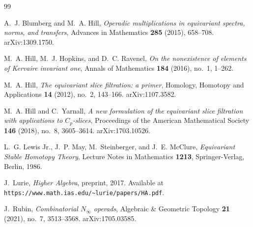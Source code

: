 \documentclass[12pt]{article}
\theoremstyle{definition}
\begin{document}
\begin{thebibliography}{99}

A.~J. Blumberg and M.~A. Hill,
\emph{Operadic multiplications in equivariant spectra, norms, and transfers},
Advances in Mathematics \textbf{285} (2015), 658--708.
arXiv:1309.1750.

M.~A. Hill, M.~J. Hopkins, and D.~C. Ravenel,
\emph{On the nonexistence of elements of Kervaire invariant one},
Annals of Mathematics \textbf{184} (2016), no.~1, 1--262.

M.~A. Hill,
\emph{The equivariant slice filtration: a primer},
Homology, Homotopy and Applications \textbf{14} (2012), no.~2, 143--166.
arXiv:1107.3582.

M.~A. Hill and C.~Yarnall,
\emph{A new formulation of the equivariant slice filtration with applications to
  $C_p$-slices},
Proceedings of the American Mathematical Society \textbf{146} (2018), no.~8, 3605--3614.
arXiv:1703.10526.

L.~G. Lewis Jr., J.~P. May, M.~Steinberger, and J.~E. McClure,
\emph{Equivariant Stable Homotopy Theory},
Lecture Notes in Mathematics \textbf{1213},
Springer-Verlag, Berlin, 1986.

J.~Lurie,
\emph{Higher Algebra},
preprint, 2017.
Available at \texttt{https://www.math.ias.edu/\textasciitilde lurie/papers/HA.pdf}.

J.~Rubin,
\emph{Combinatorial $N_\infty$ operads},
Algebraic \& Geometric Topology \textbf{21} (2021), no.~7, 3513--3568.
arXiv:1705.03585.

\end{thebibliography}
\end{document}
